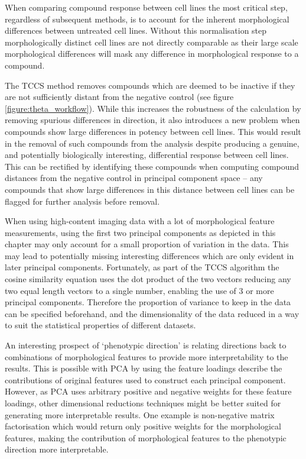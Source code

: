 \documentclass[a4paper,11pt,twoside,openright]{scrbook}
\begin{document}
When comparing compound response between cell lines the most critical step, regardless of subsequent methods, is to 
account for the inherent morphological differences between untreated cell lines.
Without this normalisation step morphologically distinct cell lines are not directly comparable as their large scale 
morphological differences will mask any difference in morphological response to a compound.

The TCCS method removes compounds which are deemed to be inactive if they are not sufficiently distant from the 
negative control (see figure \ref{figure:theta_workflow}).
While this increases the robustness of the calculation by removing spurious differences in direction, it also 
introduces a new problem when compounds show large differences in potency between cell lines.
This would result in the removal of such compounds from the analysis despite producing a genuine, and potentially 
biologically interesting, differential response between cell lines.
This can be rectified by identifying these compounds when computing compound distances from the negative control in 
principal component space -- any compounds that show large differences in this distance between cell lines can be 
flagged for further analysis before removal.

When using high-content imaging data with a lot of morphological feature measurements, using the first two principal 
components as depicted in this chapter may only account for a small proportion of variation in the data.
This may lead to potentially missing interesting differences which are only evident in later principal components.
Fortunately, as part of the TCCS algorithm the cosine similarity equation uses the dot product of the two vectors 
reducing any two equal length vectors to a single number, enabling the use of 3 or more principal components.
Therefore the proportion of variance to keep in the data can be specified beforehand, and the dimensionality of the 
data reduced in a way to suit the statistical properties of different datasets.

An interesting prospect of `phenotypic direction' is relating directions back to combinations of morphological features 
to provide more interpretability to the results.
This is possible with PCA by using the feature loadings describe the contributions of original features used to 
construct each principal component.
However, as PCA uses arbitrary positive and negative weights for these feature loadings, other dimensional reductions 
techniques might be better suited for generating more interpretable results.
One example is non-negative matrix factorisation which would return only positive weights for the morphological 
features, making the contribution of morphological features to the phenotypic direction more interpretable.
\end{document}
